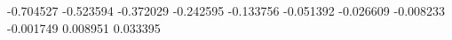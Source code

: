 -0.704527
-0.523594
-0.372029
-0.242595
-0.133756
-0.051392
-0.026609
-0.008233
-0.001749
0.008951
0.033395
